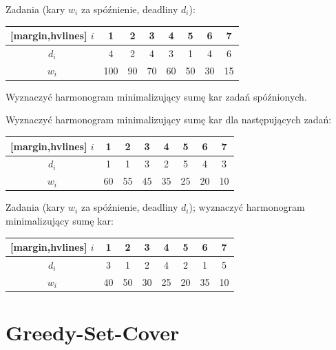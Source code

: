 \begin{example}
	Zadania (kary $w_i$ za spóźnienie, deadliny $d_i$):
	\begin{aztable}
		\centering
		\renewcommand{\arraystretch}{1.2}
		\begin{NiceTabular}{c|ccccccc}[margin,hvlines]
			$i$   & 1   & 2  & 3  & 4  & 5  & 6  & 7  \\
			\hline
			$d_i$ & 4   & 2  & 4  & 3  & 1  & 4  & 6  \\
			$w_i$ & 100 & 90 & 70 & 60 & 50 & 30 & 15
		\end{NiceTabular}
	\end{aztable}
	Wyznaczyć harmonogram minimalizujący sumę kar zadań spóźnionych.
\end{example}

\begin{example}
	Wyznaczyć harmonogram minimalizujący sumę kar dla następujących zadań:
	\begin{aztable}
		\centering
		\renewcommand{\arraystretch}{1.2}
		\begin{NiceTabular}{c|ccccccc}[margin,hvlines]
			$i$   & 1  & 2  & 3  & 4  & 5  & 6  & 7  \\
			\hline
			$d_i$ & 1  & 1  & 3  & 2  & 5  & 4  & 3  \\
			$w_i$ & 60 & 55 & 45 & 35 & 25 & 20 & 10
		\end{NiceTabular}
	\end{aztable}
\end{example}

	\begin{example}
		Zadania (kary $w_i$ za spóźnienie, deadliny $d_i$); wyznaczyć harmonogram minimalizujący sumę kar:
		\begin{aztable}
			\centering
			\renewcommand{\arraystretch}{1.2}
			\begin{NiceTabular}{c|ccccccc}[margin,hvlines]
				$i$   & 1  & 2  & 3  & 4  & 5  & 6  & 7  \\
				\hline
				$d_i$ & 3  & 1  & 2  & 4  & 2  & 1  & 5  \\
				$w_i$ & 40 & 50 & 30 & 25 & 20 & 35 & 10
			\end{NiceTabular}
		\end{aztable}
	\end{example}

\section{Greedy-Set-Cover}

